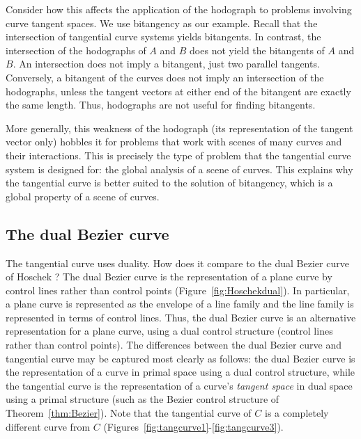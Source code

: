 \documentclass[12pt]{article}
\begin{document}
Consider how this affects the application of the hodograph to problems
involving curve tangent spaces.
We use bitangency as our example.
Recall that the intersection of tangential curve systems yields bitangents.
In contrast, the intersection of the hodographs of $A$ and $B$ does not yield the 
bitangents of $A$ and $B$.
An intersection does not imply a bitangent, just two parallel tangents.
Conversely, a bitangent of the curves does not imply an intersection
of the hodographs, unless the tangent vectors at either end of the bitangent
are exactly the same length.
Thus, hodographs are not useful for finding bitangents.

More generally, this weakness of the hodograph (its representation of the tangent
vector only) hobbles it
for problems that work with scenes of many curves and their interactions.
This is precisely the type of problem 
that the tangential curve system is designed for:
the global analysis of a scene of curves.
This explains why the tangential curve is better suited to the solution of bitangency,
which is a global property of a scene of curves.


\subsection{The dual Bezier curve}
\label{sec:dualBezier}

The tangential curve uses duality.
How does it compare to the dual Bezier curve of Hoschek \cite{hoschek83}?
The dual Bezier curve is the representation of a plane curve by control lines
rather than control points (Figure~\ref{fig:Hoschekdual}).
In particular, a plane curve is represented as the envelope of a line family
and the line family is represented in terms of control lines.
Thus, the dual Bezier curve is an alternative representation for a plane curve,
using a dual control structure (control lines rather than control points).
The differences between the dual Bezier curve
and tangential curve may be captured most clearly as follows:
the dual Bezier curve is the representation of a curve in primal space
using a dual control structure,
while the tangential curve is the representation of a curve's {\em tangent space}
in dual space using a primal structure (such as the Bezier control structure
of Theorem~\ref{thm:Bezier}).
Note that the tangential curve of $C$ is a completely different curve from $C$
(Figures~\ref{fig:tangcurve1}-\ref{fig:tangcurve3}).
\end{document}
